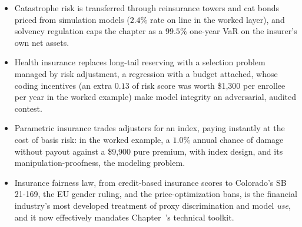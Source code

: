 \documentclass[../ai_in_finance]{subfiles}
\begin{document}
\begin{itemize}
\item Catastrophe risk is transferred through reinsurance towers and cat bonds priced from simulation models ($2.4\%$ rate on line in the worked layer), and solvency regulation caps the chapter as a $99.5\%$ one-year VaR on the insurer's own net assets.
\item Health insurance replaces long-tail reserving with a selection problem managed by risk adjustment, a regression with a budget attached, whose coding incentives (an extra $0.13$ of risk score was worth \$1{,}300 per enrollee per year in the worked example) make model integrity an adversarial, audited contest.
\item Parametric insurance trades adjusters for an index, paying instantly at the cost of basis risk: in the worked example, a $1.0\%$ annual chance of damage without payout against a \$9{,}900 pure premium, with index design, and its manipulation-proofness, the modeling problem.
\item Insurance fairness law, from credit-based insurance scores to Colorado's SB 21-169, the EU gender ruling, and the price-optimization bans, is the financial industry's most developed treatment of proxy discrimination and model \emph{use}, and it now effectively mandates Chapter~'s technical toolkit.
\end{itemize}

\end{document}
